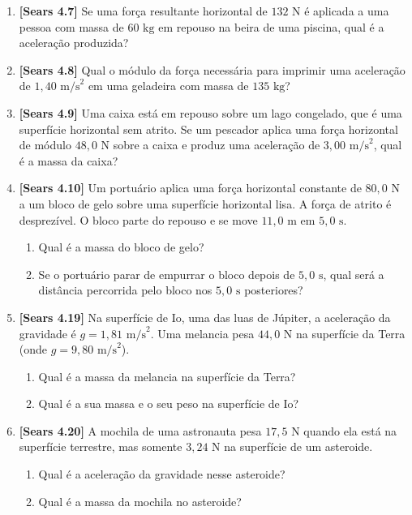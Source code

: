 \documentclass[11pt,a4paper]{article}
\begin{document}
\begin{enumerate}[label=\textbf{\arabic*.}, leftmargin=*, itemsep=0.45cm]

\item \textbf{[Sears 4.7]} Se uma força resultante horizontal de $132\text{ N}$ é aplicada a uma pessoa com massa de $60\text{ kg}$ em repouso na beira de uma piscina, qual é a aceleração produzida?

\item \textbf{[Sears 4.8]} Qual o módulo da força necessária para imprimir uma aceleração de $1,40\text{ m/s}^2$ em uma geladeira com massa de $135\text{ kg}$?

\item \textbf{[Sears 4.9]} Uma caixa está em repouso sobre um lago congelado, que é uma superfície horizontal sem atrito. Se um pescador aplica uma força horizontal de módulo $48,0\text{ N}$ sobre a caixa e produz uma aceleração de $3,00\text{ m/s}^2$, qual é a massa da caixa?

\item \textbf{[Sears 4.10]} Um portuário aplica uma força horizontal constante de $80,0\text{ N}$ a um bloco de gelo sobre uma superfície horizontal lisa. A força de atrito é desprezível. O bloco parte do repouso e se move $11,0\text{ m}$ em $5,0\text{ s}$.
\begin{enumerate}[label=\alph*)]
    \item Qual é a massa do bloco de gelo?
    \item Se o portuário parar de empurrar o bloco depois de $5,0\text{ s}$, qual será a distância percorrida pelo bloco nos $5,0\text{ s}$ posteriores?
\end{enumerate}

\item \textbf{[Sears 4.19]} Na superfície de Io, uma das luas de Júpiter, a aceleração da gravidade é $g = 1,81\text{ m/s}^2$. Uma melancia pesa $44,0\text{ N}$ na superfície da Terra (onde $g = 9,80\text{ m/s}^2$).
\begin{enumerate}[label=\alph*)]
    \item Qual é a massa da melancia na superfície da Terra?
    \item Qual é a sua massa e o seu peso na superfície de Io?
\end{enumerate}

\item \textbf{[Sears 4.20]} A mochila de uma astronauta pesa $17,5\text{ N}$ quando ela está na superfície terrestre, mas somente $3,24\text{ N}$ na superfície de um asteroide.
\begin{enumerate}[label=\alph*)]
    \item Qual é a aceleração da gravidade nesse asteroide?
    \item Qual é a massa da mochila no asteroide?
\end{enumerate}


\end{enumerate}
\end{document}
